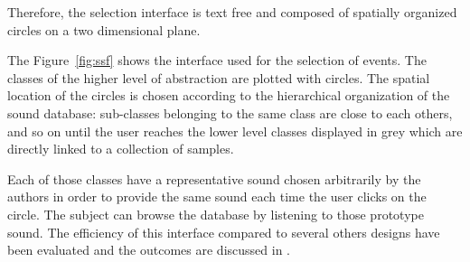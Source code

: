 \documentclass[twoside,twocolumn]{article}
\begin{document}

Therefore, the selection interface is text free and composed of spatially organized circles on a two dimensional plane.


The Figure~\ref{fig:ssf} shows the interface used for the selection of events. The classes of the higher level of abstraction are plotted with circles. The spatial location of the circles is chosen according to the hierarchical organization of the sound database: sub-classes belonging to the same class are close to each others, and so on until the user reaches the lower level classes displayed in grey which are directly linked to a collection of samples.


Each of those classes have a representative sound chosen arbitrarily by the authors in order to provide the same sound each time the user clicks on the circle. The subject can browse the database by listening to those prototype sound. The efficiency of this interface compared to several others designs have been evaluated and the outcomes are discussed in \cite{lafay2016JAES}.
\end{document}
